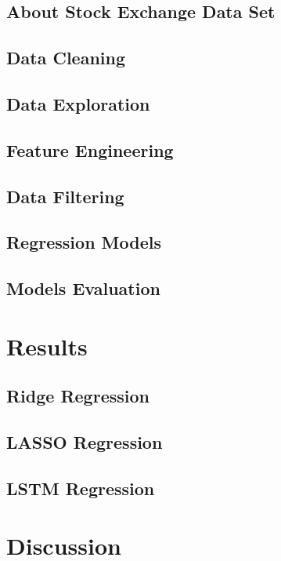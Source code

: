 \documentclass[a4paper, 11pt]{article}
\begin{document}
\subsection{About Stock Exchange Data Set}

\subsection{Data Cleaning}

\subsection{Data Exploration}

\subsection{Feature Engineering}

\subsection{Data Filtering}

\subsection{Regression Models}

\subsection{Models Evaluation}

\section{Results}
\subsection{Ridge Regression}

\subsection{LASSO Regression}

\subsection{LSTM Regression}

\section{Discussion}
\end{document}
